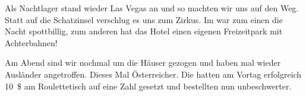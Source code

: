 Als Nachtlager stand wieder Las Vegas an und so machten wir uns auf den Weg.
Statt auf die Schatzinsel verschlug es uns zum Zirkus.
Im  war zum einen die Nacht spott\-billig, zum anderen hat das Hotel einen eigenen Freizeitpark mit Achterbahnen!

Am Abend sind wir nochmal um die Häuser gezogen und haben mal wieder Ausländer angetroffen.
Dieses Mal Österreicher.
Die hatten am Vortag erfolgreich 10~\$ am Roulettetisch auf eine Zahl gesetzt und bestellten nun unbeschwerter.
